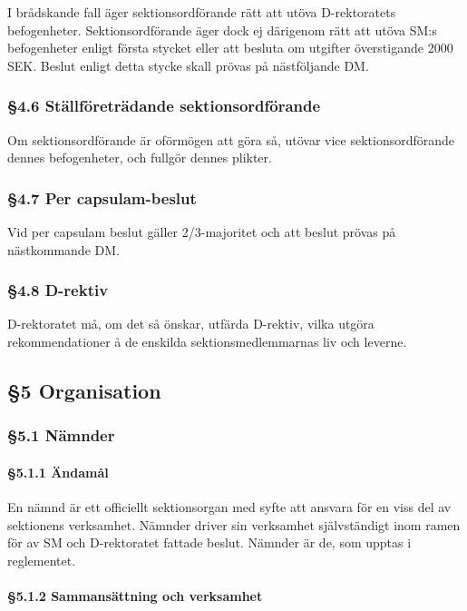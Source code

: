 I brådskande fall äger sektionsordförande rätt att utöva D-rektoratets befogenheter. Sektionsordförande äger dock ej därigenom rätt att utöva SM:s befogenheter enligt första stycket eller att besluta om utgifter överstigande 2000 SEK. Beslut enligt detta stycke skall prövas på nästföljande DM.

\subsubsection{§4.6 Ställföreträdande sektionsordförande}

Om sektionsordförande är oförmögen att göra så, utövar vice sektionsordförande dennes befogenheter, och fullgör dennes plikter.

\subsubsection{§4.7 Per capsulam-beslut}

Vid per capsulam beslut gäller 2/3-majoritet och att beslut prövas på nästkommande DM.

\subsubsection{§4.8 D-rektiv}

D-rektoratet må, om det så önskar, utfärda D-rektiv, vilka utgöra rekommendationer å de enskilda sektionsmedlemmarnas liv och leverne.

\subsection{§5 Organisation}

\subsubsection{§5.1 Nämnder}

\paragraph{§5.1.1 Ändamål}

En nämnd är ett officiellt sektionsorgan med syfte att ansvara för en viss del av sektionens verksamhet. Nämnder driver sin verksamhet självständigt inom ramen för av SM och D-rektoratet fattade beslut. Nämnder är de, som upptas i reglementet.

\paragraph{§5.1.2 Sammansättning och verksamhet}

